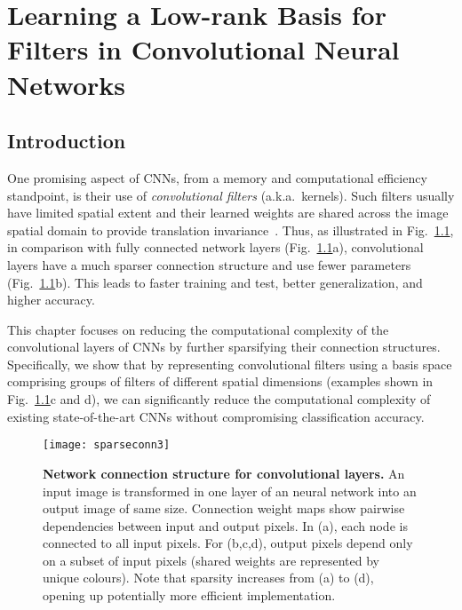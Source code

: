 \documentclass[thesis]{subfiles}
\begin{document}
	
	\chapter{Learning a Low-rank Basis for Filters in Convolutional Neural Networks}
	\label{lowrankfilters}
    
    \section{Introduction}
    One promising aspect of CNNs, from a memory and computational efficiency standpoint, is their use of \emph{convolutional filters} (a.k.a.~kernels). Such filters usually have limited spatial extent and their learned weights are shared across the image spatial domain to provide translation invariance~\citep{Fuk80,Lecun1998}.
    Thus, as illustrated in Fig.~\ref{fig:sparseconn}, in comparison with fully connected network layers (Fig.~\ref{fig:sparseconn}a), convolutional layers have a much sparser connection structure and use fewer parameters (Fig.~\ref{fig:sparseconn}b).
    This leads to faster training and test, better generalization, and higher accuracy.
    
    This chapter focuses on reducing the computational complexity of the convolutional layers of CNNs by further sparsifying their connection structures.  Specifically, we show that by representing convolutional filters using a basis space comprising groups of filters of different spatial dimensions (examples shown in Fig.~\ref{fig:sparseconn}c and d), we can significantly reduce the computational complexity of existing state-of-the-art CNNs without compromising classification accuracy.
    
    \begin{figure}[tbp] 
        \centerline{
            \texttt{[image: sparseconn3]}
        }
        \caption[Image access map visualizing sparsity of convolutional filters.]{
            {\bf Network connection structure for convolutional layers.} An input image is transformed in one layer of an neural network into an output image of same size. Connection weight maps show pairwise dependencies between input and output pixels. In (a), each node is connected to all input pixels. For (b,c,d), output pixels depend only on a subset of input pixels (shared weights are represented by unique colours). Note that sparsity increases from (a) to (d), opening up potentially more efficient implementation.
        }
        \label{fig:sparseconn}
    \end{figure}
    
\end{document}
